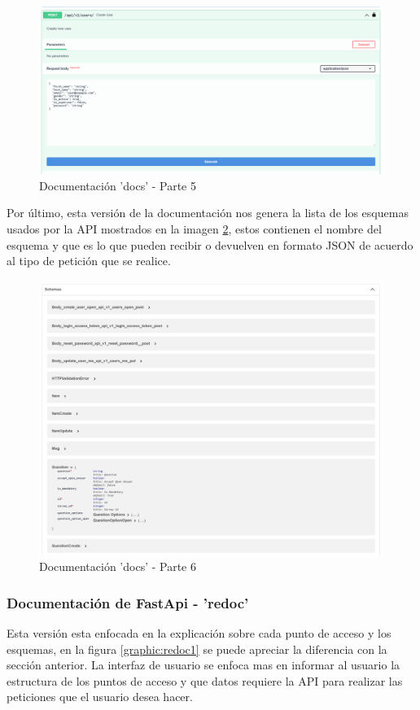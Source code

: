 \begin{figure}[!htb]
    \centering
    \includegraphics[scale=.20]{TT/img/implementacion/docs_5.png}
    \caption{Documentación 'docs' - Parte 5}
    \label{graphic:docs5}
\end{figure}

Por último, esta versión de la documentación nos genera la lista de los esquemas usados por la API mostrados en la imagen \ref{graphic:docs6}, estos contienen el nombre del esquema y que es lo que pueden recibir o devuelven en formato JSON de acuerdo al tipo de petición que se realice.
\begin{figure}[!htb]
    \centering
    \includegraphics[scale=.20]{TT/img/implementacion/docs_6.png}
    \caption{Documentación 'docs' - Parte 6}
    \label{graphic:docs6}
\end{figure}

\subsubsection{Documentación de FastApi - 'redoc'}
Esta versión esta enfocada en la explicación sobre cada punto de acceso y los esquemas, en la figura \ref{graphic:redoc1} se puede apreciar la diferencia con la sección anterior. La interfaz de usuario se enfoca mas en informar al usuario la estructura de los puntos de acceso y que datos requiere la API para realizar las peticiones que el usuario desea hacer.

